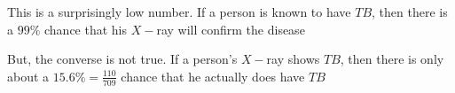 \documentclass[14pt,fleqn]{extarticle}
\newcommand\xray{$X-$ray }
\begin{document}
\begin{problem}
\begin{step}
This is a surprisingly low number. If a person is known to have $TB$, then there is a $99\%$ chance that his \xray will confirm the disease \newline 

But, the converse is not true. If a person's \xray shows $TB$, then there is only about a $15.6\% = \frac{110}{709}$ chance that he actually does have $TB$
\end{step}
\end{problem}
\end{document}
